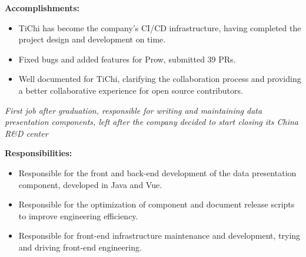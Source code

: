\documentclass{resume}
\newcommand{\en}[1]{#1}
\newcommand{\zh}[1]{}
\begin{document}
\en{\textbf{Accomplishments:}}
\zh{\textbf{产出：}}
\begin{itemize}
      \item \en{TiChi has become the company's CI/CD infrastructure, having completed the project design and development on time.}
            \zh{按时完成了项目的设计和开发，TiChi 已经成为了公司 CI/CD 的基础设施。}
      \item \en{Fixed bugs and added features for Prow, submitted 39 PRs.}
            \zh{为 Prow 修复 bug 和添加功能，提交了 39 个 PR。}
      \item \en{Well documented for TiChi, clarifying the collaboration process and providing a better collaborative experience for open source contributors.}
            \zh{为 TiChi 编写了良好的文档，明确了协作流程，为开源贡献者提供了更好的协作体验。}
\end{itemize}

\en{}
\zh{\datedsubsection{\textbf{\href{https://www.morningstar.com/}{晨星资讯（Morningstar, Inc.）- 金融服务 - 前后端开发工程师}}}{2019/06 -- 2020/07}}
\en{\textsl{First job after graduation, responsible for writing and maintaining data presentation components, left after the company decided to start closing its China R\&D center}}
\zh{\textsl{毕业后第一份工作，负责编写和维护数据展示组件，在公司决定开始关闭中国研发中心后离职}}

\en{\textbf{Responsibilities:}}
\zh{\textbf{职责：}}
\begin{itemize}
      \item \en{Responsible for the front and back-end development of the data presentation component, developed in Java and Vue.}
            \zh{负责数据展示组件的前后端开发，使用 Java 和 Vue 开发。}
      \item \en{Responsible for the optimization of component and document release scripts to improve engineering efficiency.}
            \zh{负责组件和文档发布脚本的优化，提升工程效率。}
      \item \en{Responsible for front-end infrastructure maintenance and development, trying and driving front-end engineering.}
            \zh{负责前端基础设施维护和开发，尝试和推动前端工程化。}
\end{itemize}
\end{document}
